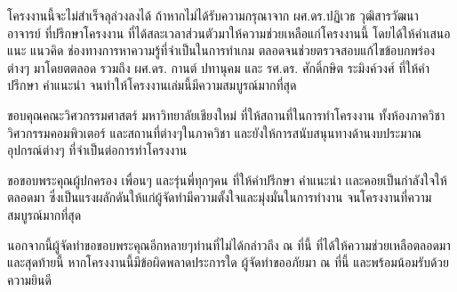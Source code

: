 \iffalse
\begin{dedication}
This document is dedicated to all Chiang Mai University students.

Dedication page is optional.
\end{dedication}
\fi %

\begin{acknowledgments}
\enskip \enskip \enskip \enskip \enskip โครงงานนี้จะไม่สําเร็จลุล่วงลงได้ ถ้าหากไม่ได้รับความกรุณาจาก ผศ.ดร.ปฏิเวธ วุฒิสารวัฒนา อาจารย์
ที่ปรึกษาโครงงาน ที่ได้สละเวลาส่วนตัวมาให้ความช่วยเหลือแก่โครงงานนี้ โดยได้ให้คําเสนอแนะ แนวคิด ช่องทางการหาความรู้ที่จำเป็นในการทำเกม ตลอดจนช่วยตรวจสอบแก้ไขข้อบกพร่องต่างๆ มาโดยตตลอด รวมถึง ผศ.ดร. กานต์ ปทานุคม และ รศ.ดร. ศักดิ์กษิต ระมิงค์วงศ์ ที่ให้คําปรึกษา คำแนะนำ จนทําให้โครงงานเล่มนี้มีความสมบูรณ์มากที่สุด

\enskip \enskip ขอบคุณคณะวิศวกรรมศาสตร์ มหาวิทยาลัยเชียงใหม่ ที่ให้สถานที่ในการทําโครงงาน ทั้งห้องภาควิชาวิศวกรรมคอมพิวเตอร์ และสถานที่ต่างๆในภาควิชา และยังให้การสนับสนุนทางด้านงบประมาณ อุปกรณ์ต่างๆ ที่จำเป็นต่อการทำโครงงาน

\enskip \enskip ขอขอบพระคุณผู้ปกครอง เพื่อนๆ และรุ่นพี่ทุกๆคน ที่ให้คำปรึกษา คำแนะนำ เเละคอยเป็นกำลังใจให้ตลอดมา ซึ่งเป็นแรงผลักดันให้แก่ผู้จัดทํามีความตั้งใจและมุ่งมั่นในการทำงาน จนโครงงานที่ความสมบูรณ์มากที่สุด 

\enskip \enskip นอกจากนี้ผู้จัดทําขอขอบพระคุณอีกหลายๆท่านที่ไม่ได้กล่าวถึง ณ ที่นี้ ที่ได้ให้ความช่วยเหลือตลอดมา และสุดท้ายนี้ หากโครงงานนี้มีข้อผิดพลาดประการใด ผู้จัดทําขออภัยมา ณ ที่นี้ และพร้อมน้อมรับด้วยความยินดี



\end{acknowledgments}%
\fi %

\contentspage

\ifproject
\figurelistpage

\tablelistpage
\fi %



